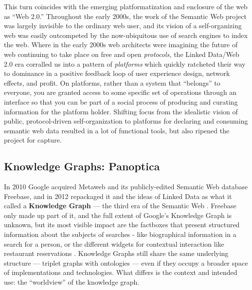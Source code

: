 This turn coincides with the emerging platformatization and enclosure of
the web as ``Web 2.0.'' Throughout the early 2000s, the work of the
Semantic Web project was largely invisible to the ordinary web user, and
its vision of a self-organizing web was easily outcompeted by the
now-ubiquitous use of search engines to index the web. Where in the
early 2000s web architects were imagining the future of web continuing
to take place on free and open \emph{protocols,} the Linked Data/Web 2.0
era corralled us into a pattern of \emph{platforms} which quickly
ratcheted their way to dominance in a positive feedback loop of user
experience design, network effects, and profit. On platforms, rather
than a system that ``belongs'' to everyone, you are granted access to
some specific set of operations through an interface so that you can be
part of a social process of producing and curating information for the
platform holder. Shifting focus from the idealistic vision of public,
protocol-driven self-organization to platforms for declaring and
consuming semantic web data resulted in a lot of functional tools, but
also ripened the project for capture.

\hypertarget{knowledge-graphs-panoptica}{%
\subsection{Knowledge Graphs:
Panoptica}\label{knowledge-graphs-panoptica}}

In 2010 Google acquired Metaweb and its publicly-edited Semantic Web
database Freebase, and in 2012 repackaged it and the ideas of Linked
Data as what it called a \textbf{Knowledge Graph} --- the third era of
the Semantic Web \cite{singhalIntroducingKnowledgeGraph2012, iainFreebaseDeadLong2016} . Freebase only made up part of it, and the
full extent of Google's Knowledge Graph is unknown, but its most visible
impact are the factboxes that present structured information about the
subjects of searches - like biographical information in a search for a
person, or the different widgets for contextual interaction like
restaurant reservations \cite{noyIndustryscaleKnowledgeGraphs2019} . Knowledge Graphs still share
the same underlying structure --- triplet graphs with ontologies ---
even if they occupy a broader space of implementations and technologies.
What differs is the context and intended use: the ``worldview'' of the
knowledge graph.


